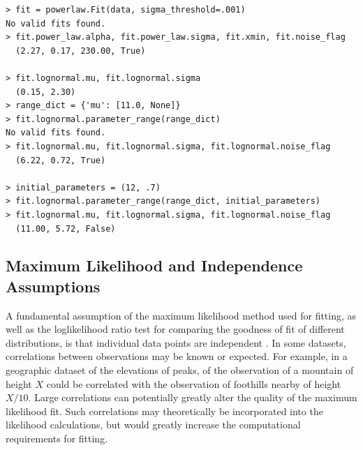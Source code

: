 \documentclass[10pt]{article}
\begin{document}
\begin{verbatim}
> fit = powerlaw.Fit(data, sigma_threshold=.001)
No valid fits found.
> fit.power_law.alpha, fit.power_law.sigma, fit.xmin, fit.noise_flag
  (2.27, 0.17, 230.00, True)

> fit.lognormal.mu, fit.lognormal.sigma
  (0.15, 2.30)
> range_dict = {'mu': [11.0, None]}
> fit.lognormal.parameter_range(range_dict)
No valid fits found.
> fit.lognormal.mu, fit.lognormal.sigma, fit.lognormal.noise_flag
  (6.22, 0.72, True)

> initial_parameters = (12, .7)
> fit.lognormal.parameter_range(range_dict, initial_parameters)
> fit.lognormal.mu, fit.lognormal.sigma, fit.lognormal.noise_flag
  (11.00, 5.72, False)
\end{verbatim}

 

%

\subsection*{Maximum Likelihood and Independence Assumptions}
A fundamental assumption of the maximum likelihood method used for fitting, as well as the loglikelihood ratio test for comparing the goodness of fit of different distributions, is that individual data points are independent \cite{Clauset2009}. In some datasets, correlations between observations may be known or expected. For example, in a geographic dataset of the elevations of peaks, of the observation of a mountain of height $X$ could be correlated with the observation of foothills nearby of height $X/10$. Large correlations can potentially greatly alter the quality of the maximum likelihood fit. Such correlations may theoretically be incorporated into the likelihood calculations, but would greatly increase the computational requirements for fitting.
\end{document}
